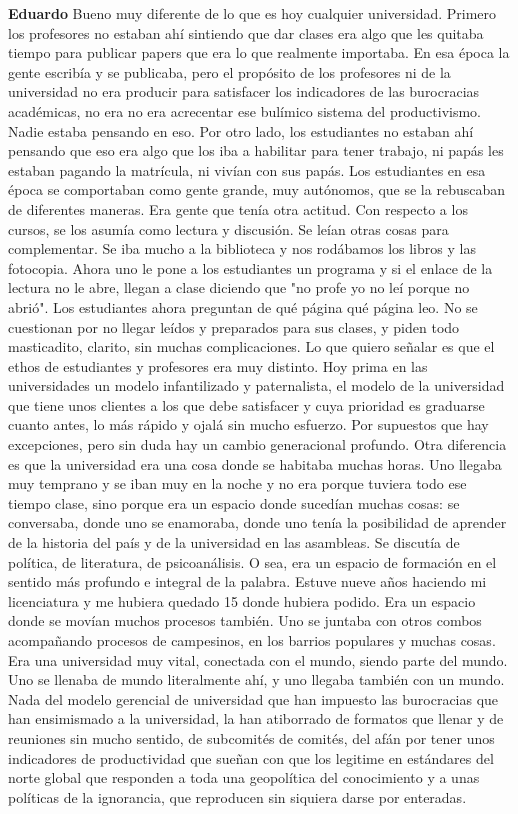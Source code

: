 \documentclass[
  spanish,
  11pt,
  a4paper,
]{scrbook}
\newenvironment{transcripcion}{
    \begin{list}{}{
        \setlength{\leftmargin}{1.5em}  %
        \setlength{\rightmargin}{0em}
        \setlength{\itemsep}{0.2em}     %
        \setlength{\parsep}{0.0em}
        \setlength{\listparindent}{0pt}
    }
}{
    \end{list}
}
\newcommand{\personaje}[1]{\textbf{#1}\quad}
\begin{document}
\begin{transcripcion}
\item \personaje{Eduardo} Bueno muy diferente de lo que es hoy cualquier universidad. Primero los profesores no estaban ahí sintiendo que dar clases era algo que les quitaba tiempo para publicar papers que era lo que realmente importaba. En esa época la gente escribía y se publicaba, pero el propósito de los profesores ni de la universidad no era producir para satisfacer los indicadores de las burocracias académicas, no era no era acrecentar ese bulímico sistema del productivismo. Nadie estaba pensando en eso. Por otro lado, los estudiantes no estaban ahí pensando que eso era algo que los iba a habilitar para tener trabajo, ni papás les estaban pagando la matrícula, ni vivían con sus papás. Los estudiantes en esa época se comportaban como gente grande, muy autónomos, que se la rebuscaban de diferentes maneras. Era gente que tenía otra actitud. Con respecto a los cursos, se los asumía como lectura y discusión. Se leían otras cosas para complementar. Se iba mucho a la biblioteca y nos rodábamos los libros y las fotocopia. Ahora uno le pone a los estudiantes un programa y si el enlace de la lectura no le abre, llegan a clase diciendo que "no profe yo no leí porque no abrió". Los estudiantes ahora preguntan de qué página qué página leo. No se cuestionan por no llegar leídos y preparados para sus clases, y piden todo masticadito, clarito, sin muchas complicaciones. Lo que quiero señalar es que el ethos de estudiantes y profesores era muy distinto. Hoy prima en las universidades un modelo infantilizado y paternalista, el modelo de la universidad que tiene unos clientes a los que debe satisfacer y cuya prioridad es graduarse cuanto antes, lo más rápido y ojalá sin mucho esfuerzo. Por supuestos que hay excepciones, pero sin duda hay un cambio generacional profundo. Otra diferencia es que la universidad era una cosa donde se habitaba muchas horas. Uno llegaba muy temprano y se iban muy en la noche y no era porque tuviera todo ese tiempo clase, sino porque era un espacio donde sucedían muchas cosas: se conversaba, donde uno se enamoraba, donde uno tenía la posibilidad de aprender de la historia del país y de la universidad en las asambleas. Se discutía de política, de literatura, de psicoanálisis. O sea, era un espacio de formación en el sentido más profundo e integral de la palabra. Estuve nueve años haciendo mi licenciatura y me hubiera quedado 15 donde hubiera podido. Era un espacio donde se movían muchos procesos también. Uno se juntaba con otros combos acompañando procesos de campesinos, en los barrios populares y muchas cosas. Era una universidad muy vital, conectada con el mundo, siendo parte del mundo. Uno se llenaba de mundo literalmente ahí, y uno llegaba también con un mundo. Nada del modelo gerencial de universidad que han impuesto las burocracias que han ensimismado a la universidad, la han atiborrado de formatos que llenar y de reuniones sin mucho sentido, de subcomités de comités, del afán por tener unos indicadores de productividad que sueñan con que los legitime en estándares del norte global que responden a toda una geopolítica del conocimiento y a unas políticas de la ignorancia, que reproducen sin siquiera darse por enteradas.


\end{transcripcion}
\end{document}
